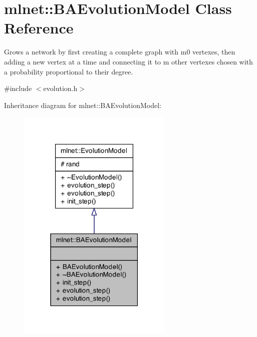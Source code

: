 \hypertarget{classmlnet_1_1_b_a_evolution_model}{\section{mlnet\+:\+:B\+A\+Evolution\+Model Class Reference}
\label{classmlnet_1_1_b_a_evolution_model}
}


Grows a network by first creating a complete graph with m0 vertexes, then adding a new vertex at a time and connecting it to m other vertexes chosen with a probability proportional to their degree.  




{\ttfamily \#include $<$evolution.\+h$>$}



Inheritance diagram for mlnet\+:\+:B\+A\+Evolution\+Model\+:\nopagebreak
\begin{figure}[H]
\begin{center}
\leavevmode
\includegraphics[width=210pt]{classmlnet_1_1_b_a_evolution_model__inherit__graph}
\end{center}
\end{figure}


